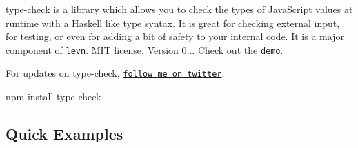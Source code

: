 \label{_type-check}%


{\ttfamily type-\/check} is a library which allows you to check the types of Java\+Script values at runtime with a Haskell like type syntax. It is great for checking external input, for testing, or even for adding a bit of safety to your internal code. It is a major component of \href{https://github.com/gkz/levn}{\tt levn}. M\+IT license. Version 0... Check out the \href{http://gkz.github.io/type-check/}{\tt demo}.

For updates on {\ttfamily type-\/check}, \href{https://twitter.com/gkzahariev}{\tt follow me on twitter}. \begin{DoxyVerb}npm install type-check
\end{DoxyVerb}


\subsection*{Quick Examples}


